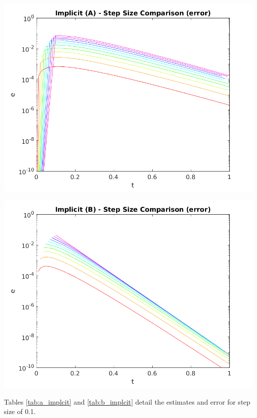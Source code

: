 \documentclass{article}
\begin{document}
\begin{center}
	\centering
    \begin{minipage}{0.5\textwidth}
        \centering
	    \includegraphics[width=1\textwidth]{../output/a_implicit_h_err.png}
    \end{minipage}\hfill
    \begin{minipage}{0.5\textwidth}
        \centering
	    \includegraphics[width=1\textwidth]{../output/b_implicit_h_err.png}
    \end{minipage}
 	\label{fig:implicit_h_err}
\end{center}

Tables \ref{tab:a_implcit} and \ref{tab:b_implcit} detail the estimates and error for step size of 0.1.
\end{document}
